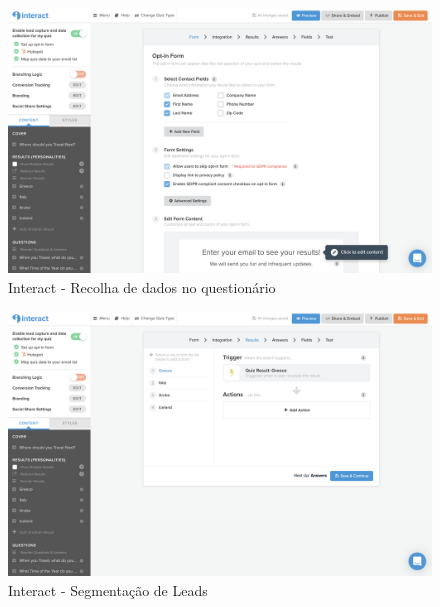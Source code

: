 \begin{figure}[ht!]
	\begin{center}
		\includegraphics[width=1\textwidth]{img/interact/collect}
		\caption{Interact - Recolha de dados no questionário}
		\label{fig:interact-collect}
	\end{center}
\end{figure}

\pagebreak


\begin{figure}[ht!]
	\begin{center}
		\includegraphics[width=1\textwidth]{img/interact/collect1}
		\caption{Interact - Segmentação de Leads}
		\label{fig:interact-collect1}
	\end{center}
\end{figure}

